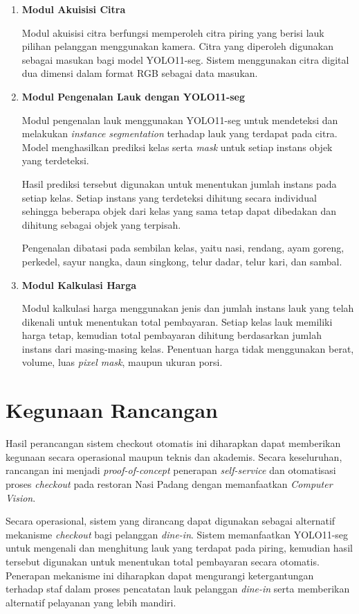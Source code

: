 \begin{enumerate}
    \item \textbf{Modul Akuisisi Citra}

    Modul akuisisi citra berfungsi memperoleh citra piring yang berisi lauk pilihan pelanggan menggunakan kamera. Citra yang diperoleh digunakan sebagai masukan bagi model YOLO11-seg. Sistem menggunakan citra digital dua dimensi dalam format RGB sebagai data masukan.

    \item \textbf{Modul Pengenalan Lauk dengan YOLO11-seg}

    Modul pengenalan lauk menggunakan YOLO11-seg untuk mendeteksi dan melakukan \textit{instance segmentation} terhadap lauk yang terdapat pada citra. Model menghasilkan prediksi kelas serta \textit{mask} untuk setiap instans objek yang terdeteksi.

    Hasil prediksi tersebut digunakan untuk menentukan jumlah instans pada setiap kelas. Setiap instans yang terdeteksi dihitung secara individual sehingga beberapa objek dari kelas yang sama tetap dapat dibedakan dan dihitung sebagai objek yang terpisah.

    Pengenalan dibatasi pada sembilan kelas, yaitu nasi, rendang, ayam goreng, perkedel, sayur nangka, daun singkong, telur dadar, telur kari, dan sambal.

    \item \textbf{Modul Kalkulasi Harga}

    Modul kalkulasi harga menggunakan jenis dan jumlah instans lauk yang telah dikenali untuk menentukan total pembayaran. Setiap kelas lauk memiliki harga tetap, kemudian total pembayaran dihitung berdasarkan jumlah instans dari masing-masing kelas. Penentuan harga tidak menggunakan berat, volume, luas \textit{pixel mask}, maupun ukuran porsi.
\end{enumerate}

\section{Kegunaan Rancangan}

Hasil perancangan sistem checkout otomatis ini diharapkan dapat memberikan kegunaan secara operasional maupun teknis dan akademis. Secara keseluruhan, rancangan ini menjadi \textit{proof-of-concept} penerapan \textit{self-service} dan otomatisasi proses \textit{checkout} pada restoran Nasi Padang dengan memanfaatkan \textit{Computer Vision}.

Secara operasional, sistem yang dirancang dapat digunakan sebagai alternatif mekanisme \textit{checkout} bagi pelanggan \textit{dine-in}. Sistem memanfaatkan YOLO11-seg untuk mengenali dan menghitung lauk yang terdapat pada piring, kemudian hasil tersebut digunakan untuk menentukan total pembayaran secara otomatis. Penerapan mekanisme ini diharapkan dapat mengurangi ketergantungan terhadap staf dalam proses pencatatan lauk pelanggan \textit{dine-in} serta memberikan alternatif pelayanan yang lebih mandiri.

